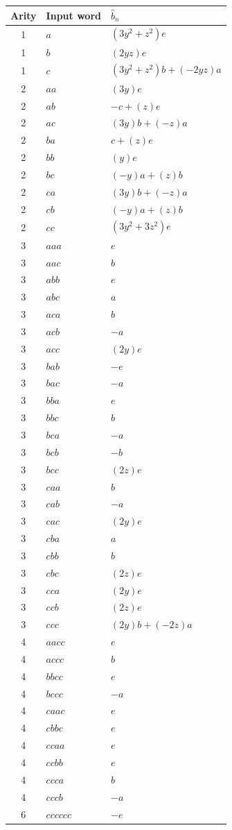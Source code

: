 \begin{longtable}{c l l}
\toprule
Arity & Input word & \(\widehat b_n\) \\
\midrule
\endhead
1 & \(a\) & \((3 y^{2} + z^{2})e\) \\
1 & \(b\) & \((2 y z)e\) \\
1 & \(c\) & \((3 y^{2} + z^{2})b+(- 2 y z)a\) \\
2 & \(aa\) & \((3 y)e\) \\
2 & \(ab\) & \(-c+(z)e\) \\
2 & \(ac\) & \((3 y)b+(- z)a\) \\
2 & \(ba\) & \(c+(z)e\) \\
2 & \(bb\) & \((y)e\) \\
2 & \(bc\) & \((- y)a+(z)b\) \\
2 & \(ca\) & \((3 y)b+(- z)a\) \\
2 & \(cb\) & \((- y)a+(z)b\) \\
2 & \(cc\) & \((3 y^{2} + 3 z^{2})e\) \\
3 & \(aaa\) & \(e\) \\
3 & \(aac\) & \(b\) \\
3 & \(abb\) & \(e\) \\
3 & \(abc\) & \(a\) \\
3 & \(aca\) & \(b\) \\
3 & \(acb\) & \(-a\) \\
3 & \(acc\) & \((2 y)e\) \\
3 & \(bab\) & \(-e\) \\
3 & \(bac\) & \(-a\) \\
3 & \(bba\) & \(e\) \\
3 & \(bbc\) & \(b\) \\
3 & \(bca\) & \(-a\) \\
3 & \(bcb\) & \(-b\) \\
3 & \(bcc\) & \((2 z)e\) \\
3 & \(caa\) & \(b\) \\
3 & \(cab\) & \(-a\) \\
3 & \(cac\) & \((2 y)e\) \\
3 & \(cba\) & \(a\) \\
3 & \(cbb\) & \(b\) \\
3 & \(cbc\) & \((2 z)e\) \\
3 & \(cca\) & \((2 y)e\) \\
3 & \(ccb\) & \((2 z)e\) \\
3 & \(ccc\) & \((2 y)b+(- 2 z)a\) \\
4 & \(aacc\) & \(e\) \\
4 & \(accc\) & \(b\) \\
4 & \(bbcc\) & \(e\) \\
4 & \(bccc\) & \(-a\) \\
4 & \(caac\) & \(e\) \\
4 & \(cbbc\) & \(e\) \\
4 & \(ccaa\) & \(e\) \\
4 & \(ccbb\) & \(e\) \\
4 & \(ccca\) & \(b\) \\
4 & \(cccb\) & \(-a\) \\
6 & \(cccccc\) & \(-e\) \\
\bottomrule
\end{longtable}


